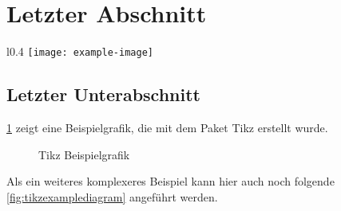 \clearpage

\section{Letzter Abschnitt}\label{sec:last}

\lipsum[1]

\begin{wrapfigure}{l}{0.4\textwidth}
    \centering
    \texttt{[image: example-image]}
    \captionsetup{width=0.9\linewidth}
    \caption[Beispielabbildung mit Text umrandet]{Beispielabbildung mit Text umrandet (eigene Abbildung)}
    \label{fig:textwrappedaroundexampleimage}
\end{wrapfigure}

\lipsum[2-4]

\clearpage

\subsection{Letzter Unterabschnitt}\label{subsec:last}

\cref{fig:tikzexamplegraphics} zeigt eine Beispielgrafik, die mit dem Paket \glqq Tikz\grqq{} erstellt wurde.

\begin{figure}[!ht]
    \centering
    \caption{Tikz Beispielgrafik}
    \label{fig:tikzexamplegraphics}
\end{figure}

\noindent Als ein weiteres komplexeres Beispiel kann hier auch noch folgende \cref{fig:tikzexamplediagram} angeführt werden.


